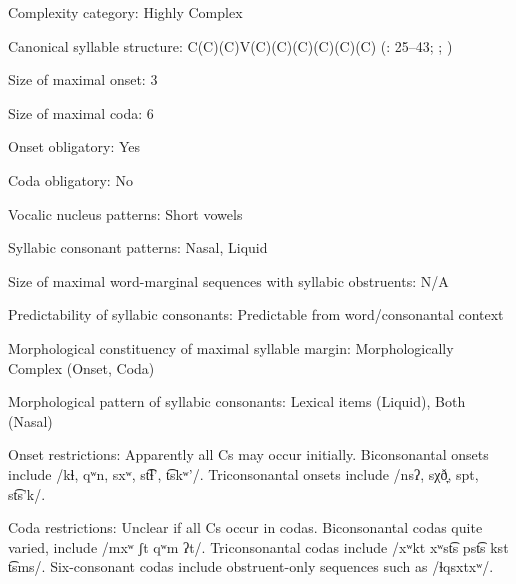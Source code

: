 {\begin{appendixdesc}
\item[Complexity category:] Highly Complex

\item[Canonical syllable structure:] C(C)(C)V(C)(C)(C)(C)(C)(C) (\citealt{ThompsonThompson1992}: 25--43; \citealt{ThompsonThompson1996}; \citealt{ThompsonEtAl1996})

\item[Size of maximal onset:] 3

\item[Size of maximal coda:] 6

\item[Onset obligatory:] Yes

\item[Coda obligatory:] No

\item[Vocalic nucleus patterns:] Short vowels

\item[Syllabic consonant patterns:] Nasal, Liquid

\item[Size of maximal word-marginal sequences with syllabic obstruents:] N/A

\item[Predictability of syllabic consonants:] Predictable from word/consonantal context

\item[Morphological constituency of maximal syllable margin:] Morphologically Complex (Onset, Coda)

\item[Morphological pattern of syllabic consonants:] Lexical items (Liquid), Both (Nasal)

\item[Onset restrictions:] Apparently all Cs may occur initially. Biconsonantal onsets include /kɬ, qʷn, sxʷ, st͡ɬ’, t͡skʷ’/. Triconsonantal onsets include /nsʔ, sχð̞, spt, st͡s’k/.

\item[Coda restrictions:] Unclear if all Cs occur in codas. Biconsonantal codas quite varied, include /mxʷ ʃt qʷm ʔt/. Triconsonantal codas include /xʷkt xʷst͡s pst͡s kst t͡sms/. Six-consonant codas include obstruent-only sequences such as /ɬqsxtxʷ/.


\end{appendixdesc}}
